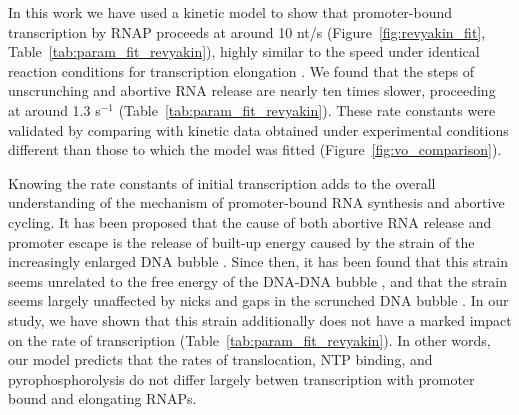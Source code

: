 %
In this work we have used a kinetic model to show that promoter-bound
transcription by RNAP proceeds at around 10 nt/s
(Figure~\ref{fig:revyakin_fit}, Table~\ref{tab:param_fit_revyakin}), highly
similar to the speed under identical reaction conditions for
transcription elongation \cite{revyakin_abortive_2006}. We found that 
the steps of unscrunching and abortive RNA release are nearly ten times
slower, proceeding at around 1.3 s$^{-1}$ (Table~\ref{tab:param_fit_revyakin}).
These rate constants were validated by comparing with kinetic data obtained
under experimental conditions different than those to which the model was
fitted (Figure~\ref{fig:vo_comparison}).

Knowing the rate constants of initial transcription adds to the overall
understanding of the mechanism of promoter-bound RNA synthesis and abortive
cycling. It has been proposed that the cause of both abortive RNA release and
promoter escape is the release of built-up energy caused by the strain of the
increasingly enlarged DNA bubble
\cite{straney_stressed_1987,hsu_promoter_2002,revyakin_abortive_2006}. Since
then, it has been found that this strain seems unrelated to the free energy of
the DNA-DNA bubble \cite{hsu_initial_2006, skancke_sequence-dependent_2015},
and that the strain seems largely unaffected by nicks and gaps in the scrunched
DNA bubble \cite{samanta_insights_2013}. In our study, we have shown that this
strain additionally does not have a marked impact on the rate of transcription
(Table~\ref{tab:param_fit_revyakin}). In other words, our model predicts that
the rates of translocation, NTP binding, and pyrophosphorolysis do not differ
largely betwen transcription with promoter bound and elongating RNAPs.

